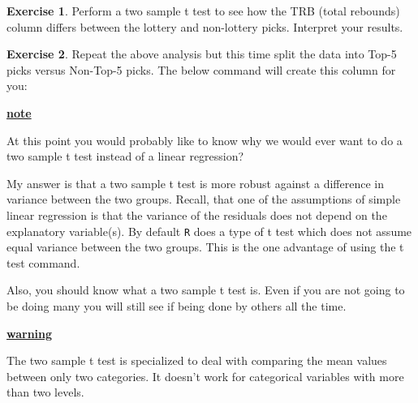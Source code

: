 \documentclass[
]{book}
\newenvironment{Shaded}{\begin{snugshade}}{\end{snugshade}}
\newcommand{\DecValTok}[1]{\textcolor[rgb]{0.00,0.00,0.81}{#1}}
\newcommand{\DocumentationTok}[1]{\textcolor[rgb]{0.56,0.35,0.01}{\textbf{\textit{#1}}}}
\newcommand{\FunctionTok}[1]{\textcolor[rgb]{0.00,0.00,0.00}{#1}}
\newcommand{\NormalTok}[1]{#1}
\newcommand{\OtherTok}[1]{\textcolor[rgb]{0.56,0.35,0.01}{#1}}
\newcommand{\SpecialCharTok}[1]{\textcolor[rgb]{0.00,0.00,0.00}{#1}}
\newcommand{\StringTok}[1]{\textcolor[rgb]{0.31,0.60,0.02}{#1}}
\newenvironment{rmdblock}[1]
  {\begin{shaded*}
  \centerline{\underline{\textbf{#1}}}

  }
  {
  \end{shaded*}
  }
\newenvironment{warning}
  {\begin{rmdblock}{warning}}
  {\end{rmdblock}}
\newenvironment{note}
  {\begin{rmdblock}{note}}
  {\end{rmdblock}}
\theoremstyle{definition}
\theoremstyle{definition}
\theoremstyle{definition}
\newtheorem{exercise}{Exercise}[chapter]
\theoremstyle{definition}
\theoremstyle{remark}
\begin{document}
\begin{exercise}
\protect\hypertarget{exr:unnamed-chunk-551}{}\label{exr:unnamed-chunk-551}Perform a two sample t test to see how the TRB (total rebounds) column differs between the lottery and non-lottery picks. Interpret your results.
\end{exercise}

\begin{exercise}
\protect\hypertarget{exr:unnamed-chunk-552}{}\label{exr:unnamed-chunk-552}Repeat the above analysis but this time split the data into Top-5 picks versus Non-Top-5 picks. The below command will create this column for you:
\end{exercise}

\begin{Shaded}
\end{Shaded}

\begin{note}
At this point you would probably like to know why we would ever want to do a two sample t test instead of a linear regression?

My answer is that a two sample t test is more robust against a difference in variance between the two groups. Recall, that one of the assumptions of simple linear regression is that the variance of the residuals does not depend on the explanatory variable(s). By default \texttt{R} does a type of t test which does not assume equal variance between the two groups. This is the one advantage of using the t test command.

Also, you should know what a two sample t test is. Even if you are not going to be doing many you will still see if being done by others all the time.
\end{note}

\begin{warning}
The two sample t test is specialized to deal with comparing the mean values between only two categories. It doesn't work for categorical variables with more than two levels.
\end{warning}
\end{document}

